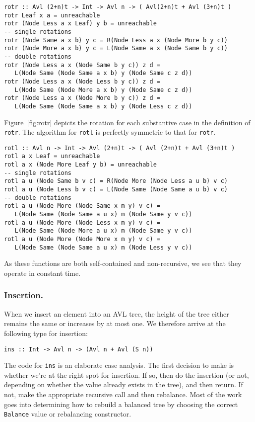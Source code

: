 {\small
\begin{verbatim}
rotr :: Avl (2+n)t -> Int -> Avl n -> ( Avl(2+n)t + Avl (3+n)t )
rotr Leaf x a = unreachable
rotr (Node Less a x Leaf) y b = unreachable
-- single rotations
rotr (Node Same a x b) y c = R(Node Less a x (Node More b y c))
rotr (Node More a x b) y c = L(Node Same a x (Node Same b y c))
-- double rotations
rotr (Node Less a x (Node Same b y c)) z d = 
   L(Node Same (Node Same a x b) y (Node Same c z d))
rotr (Node Less a x (Node Less b y c)) z d = 
   L(Node Same (Node More a x b) y (Node Same c z d))
rotr (Node Less a x (Node More b y c)) z d = 
   L(Node Same (Node Same a x b) y (Node Less c z d))
\end{verbatim}
}
\noindent
Figure~\ref{fig:rotr} depicts the rotation for each substantive case in the
        definition of \verb|rotr|.
The algorithm for \verb|rotl| is perfectly symmetric to that for \verb|rotr|.

{\small
\begin{verbatim}
rotl :: Avl n -> Int -> Avl (2+n)t -> ( Avl (2+n)t + Avl (3+n)t )
rotl a x Leaf = unreachable
rotl a x (Node More Leaf y b) = unreachable
-- single rotations
rotl a u (Node Same b v c) = R(Node More (Node Less a u b) v c)
rotl a u (Node Less b v c) = L(Node Same (Node Same a u b) v c)
-- double rotations
rotl a u (Node More (Node Same x m y) v c) = 
   L(Node Same (Node Same a u x) m (Node Same y v c))
rotl a u (Node More (Node Less x m y) v c) = 
   L(Node Same (Node More a u x) m (Node Same y v c))
rotl a u (Node More (Node More x m y) v c) = 
   L(Node Same (Node Same a u x) m (Node Less y v c))
\end{verbatim}
}
\noindent
As these functions are both self-contained and non-recursive, we see that
they operate in constant time.

\subsubsection{Insertion.}

When we insert an element into an AVL tree, the height of the
tree either remains the same or increases by at most one.
We therefore arrive at the following type for insertion:

{\small
\begin{verbatim}
ins :: Int -> Avl n -> (Avl n + Avl (S n))
\end{verbatim}
}
The code for \verb|ins| is an elaborate case analysis.
The first decision to make is whether we're at the right spot for 
insertion.  If so, then do the insertion (or not, depending on whether 
the value already exists in the tree), and then return.  If not, make the 
appropriate recursive call and then rebalance.
Most of the work goes into determining how to rebuild a balanced tree 
by choosing the correct \verb|Balance| value or rebalancing constructor.

